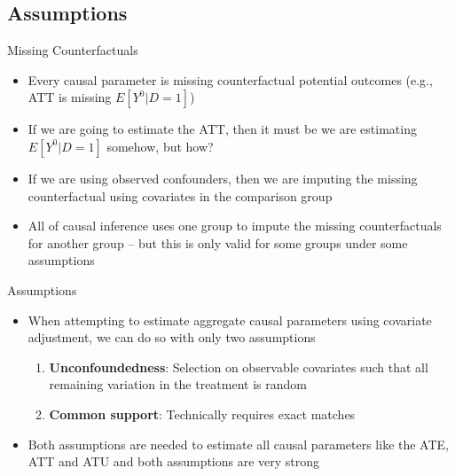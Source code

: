 \documentclass{beamer}
\begin{document}
\subsection{Assumptions}


\begin{frame}{Missing Counterfactuals}


\begin{itemize}
\item Every causal parameter is missing counterfactual potential outcomes (e.g., ATT is missing $E[Y^0|D=1]$)
\item If we are going to estimate the ATT, then it must be we are estimating $E[Y^0|D=1]$ somehow, but how?
\item If we are using observed confounders, then we are imputing the missing counterfactual using covariates in the comparison group
\item All of causal inference uses one group to impute the missing counterfactuals for another group -- but this is only valid for some groups under some assumptions

\end{itemize}


\end{frame}


\begin{frame}{Assumptions}

\begin{itemize}

\item When attempting to estimate aggregate causal parameters using covariate adjustment, we can do so with only two assumptions

	\begin{enumerate}
	\item \textbf{Unconfoundedness}:  Selection on observable covariates such that all remaining variation in the treatment is random
	\item \textbf{Common support}: Technically requires exact matches
	\end{enumerate}
\item Both assumptions are needed to estimate all causal parameters like the ATE, ATT and ATU and both assumptions are very strong
\end{itemize}

\end{frame}
\end{document}
